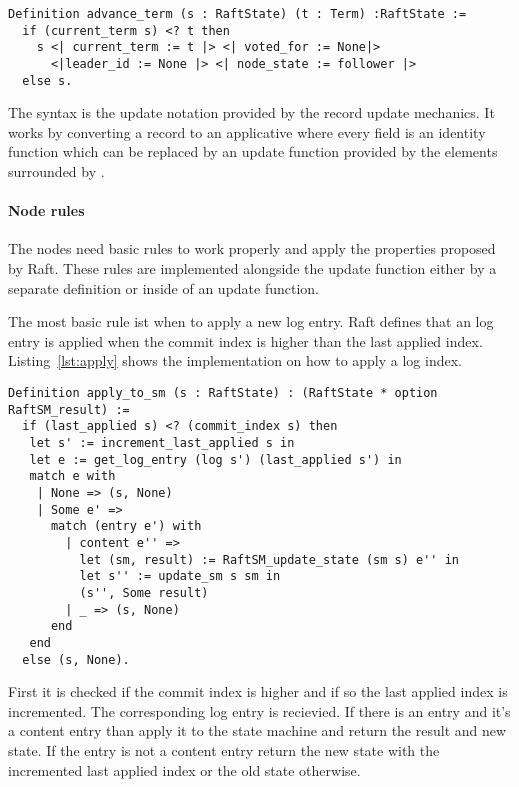 \begin{lstlisting}[style=coq,label=lst:advance,
caption=The process transition to advance to the next term.]
Definition advance_term (s : RaftState) (t : Term) :RaftState :=
  if (current_term s) <? t then
    s <| current_term := t |> <| voted_for := None|>
      <|leader_id := None |> <| node_state := follower |>
  else s.
\end{lstlisting}

The  syntax is the update notation provided by the
record update mechanics. It works by converting a record to
an applicative where every field is an identity function which
can be replaced by an update function provided by the elements
surrounded by \code{<| |>}.

\paragraph{Node rules}
The nodes need basic rules to work properly and apply the
properties proposed by Raft. These rules are implemented alongside
the update function either by a separate definition or inside
of an update function.

The most basic rule ist when to apply a new log entry.
Raft defines that an log entry is applied when the commit index
is higher than the last applied index. Listing~\ref{lst:apply} shows
the implementation on how to apply a log index. 

\begin{lstlisting}[style=coq,label=lst:apply,
caption=How a log is applied to the local state machine.]
Definition apply_to_sm (s : RaftState) : (RaftState * option RaftSM_result) :=
  if (last_applied s) <? (commit_index s) then 
   let s' := increment_last_applied s in 
   let e := get_log_entry (log s') (last_applied s') in
   match e with
    | None => (s, None) 
    | Some e' => 
      match (entry e') with
        | content e'' => 
          let (sm, result) := RaftSM_update_state (sm s) e'' in
          let s'' := update_sm s sm in
          (s'', Some result)
        | _ => (s, None) 
      end
   end
  else (s, None). 
\end{lstlisting}

First it is checked if the commit index is higher and if so the last
applied index is incremented. The corresponding log entry is recievied.
If there is an entry and it's a content entry than apply it to the
state machine and return the result and new state. 
If the entry is not a content entry return the new
state with the incremented last applied index or the old state otherwise.

